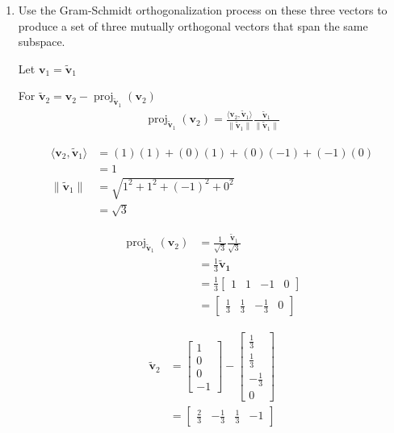 \documentclass{tufte-book}
\DeclareMathOperator{\proj}{proj}
\newcommand{\vct}{\mathbf}
\newcommand{\dprod}[2]{\langle #1, #2 \rangle}
\theoremstyle{mytheoremstyle}
\theoremstyle{mylemstyle}
\theoremstyle{mydefstyle}
\begin{document}
\begin{enumerate}
\item Use the Gram-Schmidt orthogonalization process on these three vectors to produce a set of three mutually orthogonal vectors that span the same subspace.

Let $\vct{v}_1 = \vct{\tilde{v}}_1$

For $\vct{\tilde{v}}_2 = \vct{v}_2 - \proj_{\vct{\tilde{v}}_1}(\vct{v}_2)$
\begin{align*}
\proj_{\vct{\tilde{v}}_1}(\vct{v}_2) = \frac{\dprod{\vct{v}_2}{\vct{\tilde{v}}_1}}{\|\vct{\tilde{v}}_1\|}\frac{\vct{\tilde{v}}_1}{\|\vct{\tilde{v}}_1\|}
\end{align*}

\begin{align*}
\dprod{\vct{v}_2}{\vct{\tilde{v}}_1} &= (1)(1) + (0)(1) + (0)({-1}) +(-1)(0)\\
&=1 \\
\|\vct{\tilde{v}}_1\| &= \sqrt{1^2+1^2+(-1)^2+0^2} \\
&= \sqrt{3}
\end{align*}

\begin{align*}
\proj_{\vct{\tilde{v}}_1}(\vct{v}_2) &= \frac{1}{\sqrt{3}}\frac{\vct{\tilde{v}}_1}{\sqrt{3}}\\
&= \frac{1}{3}\vct{\tilde{v}_1}\\
&= \frac{1}{3}
\begin{bmatrix}
1&1&-1&0
\end{bmatrix} \\
&=
\begin{bmatrix}
\frac{1}{3} & \frac{1}{3} &-\frac{1}{3} & 0
\end{bmatrix}
\end{align*}

\begin{align*}
\vct{\tilde{v}}_2 &= 
\begin{bmatrix}
1 \\
0 \\
0 \\ 
-1 
\end{bmatrix}
-
\begin{bmatrix}
\frac{1}{3} \\
\frac{1}{3} \\ 
{-\frac{1}{3}} \\
0
\end{bmatrix} \\
&=
\begin{bmatrix}
\frac{2}{3} & -\frac{1}{3} &\frac{1}{3} & -1
\end{bmatrix}
\end{align*}



\end{enumerate}
\end{document}
